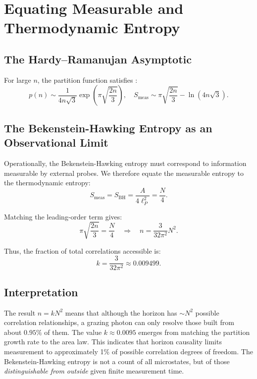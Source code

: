 \documentclass[12pt, letterpaper]{article}
\begin{document}
\section{Equating Measurable and Thermodynamic Entropy}

\subsection{The Hardy–Ramanujan Asymptotic}

For large $n$, the partition function satisfies \cite{hardy1918}:
\begin{equation}
p(n) \sim \frac{1}{4n\sqrt{3}} \exp\left( \pi \sqrt{\frac{2n}{3}} \right),
\quad
S_{\mathrm{meas}} \sim \pi \sqrt{\frac{2n}{3}} - \ln(4n\sqrt{3}).
\label{eq:HR}
\end{equation}

\subsection{The Bekenstein-Hawking Entropy as an Observational Limit}

Operationally, the Bekenstein-Hawking entropy must correspond to information measurable by external probes. We therefore equate the measurable entropy to the thermodynamic entropy:
\[
S_{\mathrm{meas}} = S_{\mathrm{BH}} = \frac{A}{4\ell_P^2} = \frac{N}{4}.
\]

Matching the leading-order term gives:
\[
\pi \sqrt{\frac{2n}{3}} = \frac{N}{4}
\quad\Rightarrow\quad
n = \frac{3}{32\pi^2} N^2.
\]

Thus, the fraction of total correlations accessible is:
\begin{equation}
k = \frac{3}{32\pi^2} \approx 0.009499.
\label{eq:k}
\end{equation}

\subsection{Interpretation}

The result $n = k N^2$ means that although the horizon has $\sim N^2$ possible correlation relationships, a grazing photon can only resolve those built from about $0.95\%$ of them. The value $k \approx 0.0095$ emerges from matching the partition growth rate to the area law. This indicates that horizon causality limits measurement to approximately 1\% of possible correlation degrees of freedom. The Bekenstein-Hawking entropy is not a count of all microstates, but of those \emph{distinguishable from outside} given finite measurement time.
\end{document}
